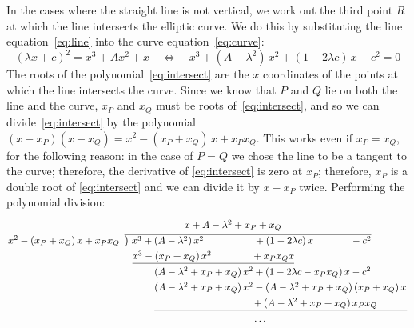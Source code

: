 \documentclass{article}
\begin{document}
In the cases where the straight line is not vertical, we work out the third point $R$ at which the line intersects the elliptic curve.
We do this by substituting the line equation~\eqref{eq:line} into the curve equation~\eqref{eq:curve}:
\begin{equation}
(\lambda x + c)^2 = x^3 + Ax^2 + x \quad\iff\quad x^3 + (A - \lambda^2)\, x^2 + (1 - 2\lambda c)\, x - c^2 = 0 \label{eq:intersect}
\end{equation}
The roots of the polynomial~\eqref{eq:intersect} are the $x$ coordinates of the points at which the line intersects the curve.
Since we know that $P$ and $Q$ lie on both the line and the curve, $x_P$ and $x_Q$ must be roots of~\eqref{eq:intersect}, and so we can divide~\eqref{eq:intersect} by the polynomial $(x - x_P)(x - x_Q) = x^2 - (x_P + x_Q)\,x + x_P x_Q$.
This works even if $x_P=x_Q$, for the following reason: in the case of $P=Q$ we chose the line to be a tangent to the curve; therefore, the derivative of \eqref{eq:intersect} is zero at $x_P$; therefore, $x_P$ is a double root of \eqref{eq:intersect} and we can divide it by $x - x_P$ twice.
Performing the polynomial division:
\begin{equation*}\arraycolsep=1pt\def\arraystretch{1.3}
\begin{array}{ll}
& \hspace{60pt} x + A - \lambda^2 + x_P + x_Q \\
x^2 - (x_P + x_Q)\,x + x_P x_Q \;&
\overline{\smash{\big)}\; x^3 + (A - \lambda^2)\, x^2 \hspace{50pt} + (1 - 2\lambda c)\, x \hspace{37pt} - c^2} \\
& \hspace{8pt}\underline{x^3 - (x_P + x_Q)\, x^2 \hspace{40pt} + x_P x_Q x} \\
& \hspace{30pt}(A - \lambda^2 + x_P + x_Q)\, x^2 + (1 - 2\lambda c - x_P x_Q)\, x - c^2 \\
& \hspace{30pt}(A - \lambda^2 + x_P + x_Q)\, x^2 - (A - \lambda^2 + x_P + x_Q)\,(x_P + x_Q)\, x \\
& \hspace{30pt}\underline{\hspace{100pt} +\, (A - \lambda^2 + x_P + x_Q)\,x_P x_Q \hspace{30pt}} \\
& \hspace{130pt}\dots
\end{array}
\end{equation*}
\end{document}

